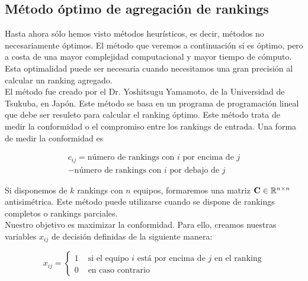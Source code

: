 \subsection{Método óptimo de agregación de rankings}

Hasta ahora sólo hemos visto métodos heurísticos, es decir, métodos no necesariamente óptimos. El método que veremos a continuación sí es óptimo, pero a costa de una mayor complejidad computacional y mayor tiempo de cómputo. Esta optimalidad puede ser necesaria cuando necesitamos una gran precisión al calcular un ranking agregado.\\

El método fue creado por el Dr. Yoshitsugu Yamamoto, de la Universidad de Tsukuba, en Japón. Este método se basa en un programa de programación lineal que debe ser resuleto para calcular el ranking óptimo. Este método trata de medir la conformidad o el compromiso entre los rankings de entrada. Una forma de medir la conformidad es

\begin{multline}
c_{ij} = \text{número de rankings con $i$ por encima de $j$} \\ - \text{número de rankings con $i$ por debajo de $j$}
\end{multline}

Si disponemos de $k$ rankings con $n$ equipos, formaremos una matriz $\mathbf{C} \in \mathbb{R}^{n\times n}$ antisimétrica. Este método puede utilizarse cuando se dispone de rankings completos o rankings parciales.\\

Nuestro objetivo es maximizar la conformidad. Para ello, creamos nuestras variables $x_{ij}$ de decisión definidas de la siguiente manera:

\begin{equation}
x_{ij} = \begin{cases}
1 & \text{ si el equipo $i$ está por encima de $j$ en el ranking}\\
0 & \text{ en caso contrario}
\end{cases}
\end{equation}

